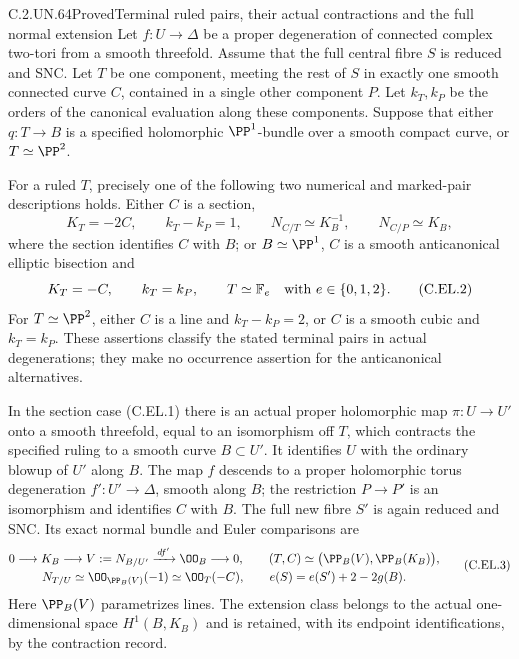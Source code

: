 \begin{statement}{C.2.UN.64}{Proved}{Terminal ruled pairs, their actual contractions and the full normal extension}
Let $f:U\to\Delta$ be a proper degeneration of connected complex
two-tori from a smooth threefold. Assume that the full central fibre
$S$ is reduced and SNC. Let $T$ be one component, meeting the rest
of $S$ in exactly one smooth connected curve $C$, contained in a
single other component $P$. Let $k_T,k_P$ be the orders of the
canonical evaluation along these components. Suppose that either
$q:T\to B$ is a specified holomorphic $\PP^1$-bundle over a smooth
compact curve, or $T\simeq\PP^2$.

For a ruled $T$, precisely one of the following two numerical and
marked-pair descriptions holds. Either $C$ is a section,
\[
 K_T=-2C,\qquad k_T-k_P=1,\qquad
 N_{C/T}\simeq K_B^{-1},\qquad N_{C/P}\simeq K_B,
                                                        \tag{C.EL.1}
\]
where the section identifies $C$ with $B$; or $B\simeq\PP^1$,
$C$ is a smooth anticanonical elliptic bisection and
\[
 K_T=-C,\qquad k_T=k_P,\qquad
 T\simeq\mathbb F_e\quad\hbox{with }e\in\{0,1,2\}.
                                                        \tag{C.EL.2}
\]
For $T\simeq\PP^2$, either $C$ is a line and $k_T-k_P=2$,
or $C$ is a smooth cubic and $k_T=k_P$.
These assertions classify the stated terminal pairs in actual
degenerations; they make no occurrence assertion for the
anticanonical alternatives.

In the section case (C.EL.1) there is an actual proper holomorphic
map $\pi:U\to U'$ onto a smooth threefold, equal to an isomorphism
off $T$, which contracts the specified ruling to a smooth curve
$B\subset U'$. It identifies $U$ with the ordinary blowup of $U'$
along $B$. The map $f$ descends to a proper holomorphic torus
degeneration $f':U'\to\Delta$, smooth along $B$; the restriction
$P\to P'$ is an isomorphism and identifies $C$ with $B$.
The full new fibre $S'$ is again reduced and SNC. Its exact normal
bundle and Euler comparisons are
\[
\begin{gathered}
 0\longrightarrow K_B\longrightarrow V:=N_{B/U'}
        \xrightarrow{\,df'\,}\OO_B\longrightarrow0,\qquad
 (T,C)\simeq\bigl(\PP_B(V),\PP_B(K_B)\bigr),\\
 N_{T/U}\simeq\OO_{\PP_B(V)}(-1)\simeq\OO_T(-C),\qquad
 e(S)=e(S')+2-2g(B).
\end{gathered}                                                   \tag{C.EL.3}
\]
Here $\PP_B(V)$ parametrizes lines. The extension class belongs
to the actual one-dimensional space $H^1(B,K_B)$ and is retained,
with its endpoint identifications, by the contraction record.


\end{statement}
